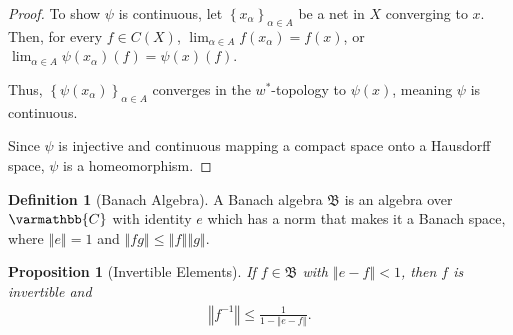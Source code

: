 \documentclass[12pt]{extarticle}
\newcommand{\C}{\mathbb{C}}
\newcommand{\norm}[1]{\left\Vert #1\right\Vert}
\newcommand{\set}[1]{\left\{#1\right\}}
\theoremstyle{plain}
\newtheorem*{proposition}{Proposition}
\theoremstyle{definition}
\newtheorem*{definition}{Definition}
\theoremstyle{note}
\renewcommand*{\mathbb}[1]{\varmathbb{#1}}
\renewcommand{\newline}{\hfill\break}
\begin{document}
\begin{proof}
  To show $\psi$ is continuous, let $\set{x_{\alpha}}_{\alpha \in A}$ be a net in $X$ converging to $x$. Then, for every $f\in C(X)$, $\lim_{\alpha \in A}f\left(x_{\alpha}\right) = f(x)$, or $\lim_{\alpha \in A}\psi\left(x_{\alpha}\right)(f) = \psi(x)(f)$.\newline

  Thus, $\set{\psi\left(x_{\alpha}\right)}_{\alpha \in A}$ converges in the $w^{\ast}$-topology to $\psi(x)$, meaning $\psi$ is continuous.\newline

  Since $\psi$ is injective and continuous mapping a compact space onto a Hausdorff space, $\psi$ is a homeomorphism.
\end{proof}
\begin{definition}[Banach Algebra]
  A Banach algebra $\mathfrak{B}$ is an algebra over $\C$ with identity $e$ which has a norm that makes it a Banach space, where $\norm{e} = 1$ and $\norm{fg} \leq \norm{f}\norm{g}$.
\end{definition}
\begin{proposition}[Invertible Elements]
  If $f\in \mathfrak{B}$ with $\norm{e-f} < 1$, then $f$ is invertible and
  \begin{align*}
    \norm{f^{-1}}\leq \frac{1}{1-\norm{e-f}}.
  \end{align*}
\end{proposition}
\end{document}
